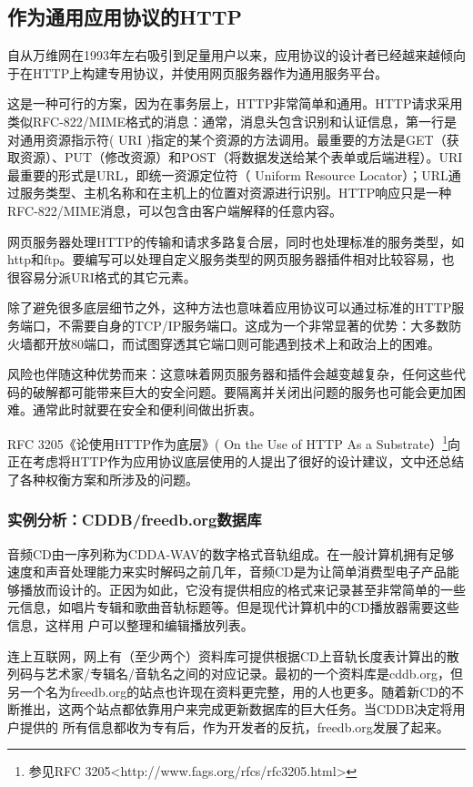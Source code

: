 \documentclass[12pt,oneside]{book}
\begin{document}
\begin{common-format}
\subsection{作为通用应用协议的HTTP}
自从万维网在1993年左右吸引到足量用户以来，应用协议的设计者已经越来越倾向于在HTTP上构建专用协议，并使用网页服务器作为通用服务平台。

这是一种可行的方案，因为在事务层上，HTTP非常简单和通用。HTTP请求采用类似RFC-822/MIME格式的消息：通常，消息头包含识别和认证信息，第一行是对通用资源指示符( URI )指定的某个资源的方法调用。最重要的方法是GET（获取资源）、PUT（修改资源）和POST（将数据发送给某个表单或后端进程）。URI最重要的形式是URL，即统一资源定位符（ Uniform Resource Locator）；URL通过服务类型、主机名称和在主机上的位置对资源进行识别。HTTP响应只是一种RFC-822/MIME消息，可以包含由客户端解释的任意内容。

网页服务器处理HTTP的传输和请求多路复合层，同时也处理标准的服务类型，如http和ftp。要编写可以处理自定义服务类型的网页服务器插件相对比较容易，也很容易分派URI格式的其它元素。

除了避免很多底层细节之外，这种方法也意味着应用协议可以通过标准的HTTP服务端口，不需要自身的TCP/IP服务端口。这成为一个非常显著的优势：大多数防火墙都开放80端口，而试图穿透其它端口则可能遇到技术上和政治上的困难。

风险也伴随这种优势而来：这意味着网页服务器和插件会越变越复杂，任何这些代码的破解都可能带来巨大的安全问题。要隔离并关闭出问题的服务也可能会更加困难。通常此时就要在安全和便利间做出折衷。

RFC 3205《论使用HTTP作为底层》( On the Use of HTTP As a Substrate）\footnote{参见RFC 3205<http://www.fags.org/rfcs/rfc3205.html>}向正在考虑将HTTP作为应用协议底层使用的人提出了很好的设计建议，文中还总结了各种权衡方案和所涉及的问题。

\subsubsection{实例分析：CDDB/freedb.org数据库}
音频CD由一序列称为CDDA-WAV的数字格式音轨组成。在一般计算机拥有足够速度和声音处理能力来实时解码之前几年，音频CD是为让简单消费型电子产品能够播放而设计的。正因为如此，它没有提供相应的格式来记录甚至非常简单的一些元信息，如唱片专辑和歌曲音轨标题等。但是现代计算机中的CD播放器需要这些信息，这样用
户可以整理和编辑播放列表。

连上互联网，网上有（至少两个）资料库可提供根据CD上音轨长度表计算出的散列码与艺术家/专辑名/音轨名之间的对应记录。最初的一个资料库是cddb.org，但另一个名为freedb.org的站点也许现在资料更完整，用的人也更多。随着新CD的不断推出，这两个站点都依靠用户来完成更新数据库的巨大任务。当CDDB决定将用户提供的
所有信息都收为专有后，作为开发者的反抗，freedb.org发展了起来。


\end{common-format}
\end{document}

